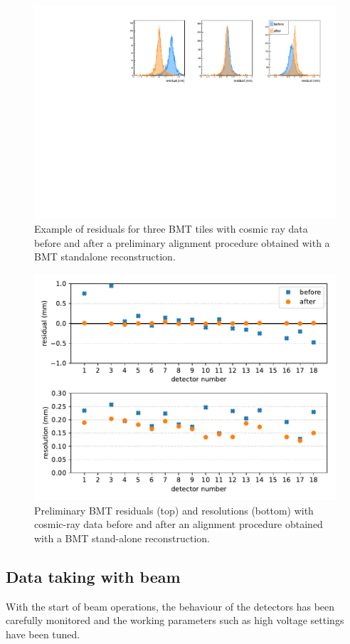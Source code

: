 \begin{figure}[htb]
 \includegraphics[width=.45\textwidth]{images/cosmic_residuals.pdf}
 \caption{Example of residuals for three BMT tiles with cosmic ray data before and after a preliminary alignment procedure obtained with a BMT standalone reconstruction.}
 \label{fig:mm-cosmic_residuals}
\end{figure}

\begin{figure}[htb]
 \includegraphics[width=\columnwidth]{images/residuals_and_resolutions.pdf}
 \caption{Preliminary BMT residuals (top) and resolutions (bottom) with cosmic-ray data before and after an alignment procedure obtained with a BMT stand-alone reconstruction.}
 \label{fig:mm-cosmic_res_summary}
\end{figure}

\subsection{Data taking with beam}

With the start of beam operations, the behaviour of the detectors has been carefully monitored and the working parameters such as high voltage settings have been tuned.

